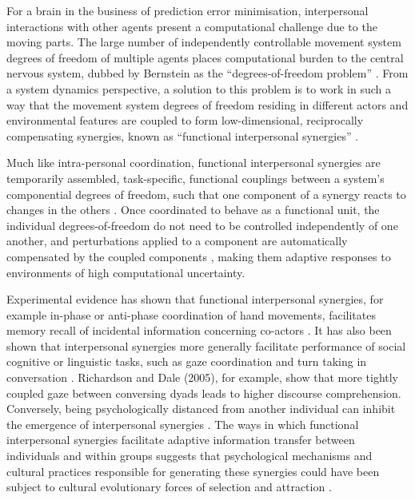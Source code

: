 \begin{CJK}{UTF8}{gbsn}
{
For a brain in the business of prediction error minimisation, interpersonal interactions with other agents present a computational challenge due to the moving parts.  The large number of independently controllable movement system degrees of freedom of multiple agents places computational burden to the central nervous system, dubbed by Bernstein \textcite{Bernstein1967} as the ``degrees-of-freedom problem'' \citep[see also][]{Turvey1982,Turvey1990}.  From a system dynamics perspective, a solution to this problem is to work in such a way that the movement system degrees of freedom residing in different actors and environmental features are coupled to form low-dimensional, reciprocally compensating synergies, known as ``functional interpersonal synergies'' \citep{Riley2011}.

Much like intra-personal coordination, functional interpersonal synergies are temporarily assembled, task-specific, functional couplings between a system's componential degrees of freedom, such that one component of a synergy reacts to changes in the others \citep{Kelso2009}.  Once coordinated to behave as a functional unit, the individual degrees-of-freedom do not need to be controlled independently of one another, and perturbations applied to a component are automatically compensated by the coupled components \citep{Kelso1984,Latash2002,Riley2011}, making them adaptive responses to environments of high computational uncertainty.

Experimental evidence has shown that functional interpersonal synergies, for example in-phase or anti-phase coordination of hand movements, facilitates memory recall of incidental information concerning co-actors \citep{Miles2010}. It has also been shown that interpersonal synergies more generally facilitate performance of social cognitive or linguistic tasks, such as gaze coordination and turn taking in conversation \citep{Richardson2005,Shockley2009}.  Richardson and Dale (2005), for example, show that more tightly coupled gaze between conversing dyads leads to higher discourse comprehension.  Conversely, being psychologically distanced from another individual can inhibit the emergence of interpersonal synergies \citep{Miles2010}.  The ways in which functional interpersonal synergies facilitate adaptive information transfer between individuals and within groups suggests that psychological mechanisms and cultural practices responsible for generating these synergies could have been subject to cultural evolutionary forces of selection and attraction \citep{Claidiere2014,Mesoudi2016a}.

}
\end{CJK}
